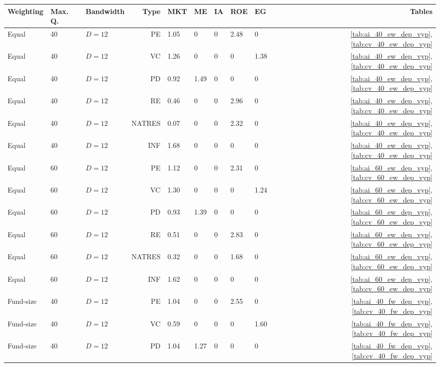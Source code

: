 \documentclass[12pt]{article}
\begin{document}
\begin{table}[ht]
	\centering
	\begin{tabular}{lllrlllllr}
		Weighting & Max. Q. & Bandwidth & Type & MKT & ME & IA & ROE & EG & Tables \\ 
		\hline
		\hline
		Equal & 40 & $D=12$ & PE & 1.05 & 0 & 0 & 2.48 & 0 & \ref{tab:ai_40_ew_dep_vyp}, \ref{tab:cv_40_ew_dep_vyp} \\ 
		Equal & 40 & $D=12$ & VC & 1.26 & 0 & 0 & 0 & 1.38 & \ref{tab:ai_40_ew_dep_vyp}, \ref{tab:cv_40_ew_dep_vyp} \\ 
		Equal & 40 & $D=12$ & PD & 0.92 & 1.49 & 0 & 0 & 0 & \ref{tab:ai_40_ew_dep_vyp}, \ref{tab:cv_40_ew_dep_vyp} \\ 
		Equal & 40 & $D=12$ & RE & 0.46 & 0 & 0 & 2.96 & 0 & \ref{tab:ai_40_ew_dep_vyp}, \ref{tab:cv_40_ew_dep_vyp} \\ 
		Equal & 40 & $D=12$ & NATRES & 0.07 & 0 & 0 & 2.32 & 0 & \ref{tab:ai_40_ew_dep_vyp}, \ref{tab:cv_40_ew_dep_vyp} \\ 
		Equal & 40 & $D=12$ & INF & 1.68 & 0 & 0 & 0 & 0 & \ref{tab:ai_40_ew_dep_vyp}, \ref{tab:cv_40_ew_dep_vyp} \\ 
		\hline
		Equal & 60 & $D=12$ & PE & 1.12 & 0 & 0 & 2.31 & 0 & \ref{tab:ai_60_ew_dep_vyp}, \ref{tab:cv_60_ew_dep_vyp} \\ 
		Equal & 60 & $D=12$ & VC & 1.30 & 0 & 0 & 0 & 1.24 & \ref{tab:ai_60_ew_dep_vyp}, \ref{tab:cv_60_ew_dep_vyp} \\ 
		Equal & 60 & $D=12$ & PD & 0.93 & 1.39 & 0 & 0 & 0 & \ref{tab:ai_60_ew_dep_vyp}, \ref{tab:cv_60_ew_dep_vyp} \\ 
		Equal & 60 & $D=12$ & RE & 0.51 & 0 & 0 & 2.83 & 0 & \ref{tab:ai_60_ew_dep_vyp}, \ref{tab:cv_60_ew_dep_vyp} \\ 
		Equal & 60 & $D=12$ & NATRES & 0.32 & 0 & 0 & 1.68 & 0 & \ref{tab:ai_60_ew_dep_vyp}, \ref{tab:cv_60_ew_dep_vyp} \\ 
		Equal & 60 & $D=12$ & INF & 1.62 & 0 & 0 & 0 & 0 & \ref{tab:ai_60_ew_dep_vyp}, \ref{tab:cv_60_ew_dep_vyp} \\ 
		\hline
		\hline
		Fund-size & 40 & $D=12$ & PE & 1.04 & 0 & 0 & 2.55 & 0 & \ref{tab:ai_40_fw_dep_vyp}, \ref{tab:cv_40_fw_dep_vyp} \\ 
		Fund-size & 40 & $D=12$ & VC & 0.59 & 0 & 0 & 0 & 1.60 & \ref{tab:ai_40_fw_dep_vyp}, \ref{tab:cv_40_fw_dep_vyp} \\ 
		Fund-size & 40 & $D=12$ & PD & 1.04 & 1.27 & 0 & 0 & 0 & \ref{tab:ai_40_fw_dep_vyp}, \ref{tab:cv_40_fw_dep_vyp} \\ 

\end{tabular}
\end{table}
\end{document}
